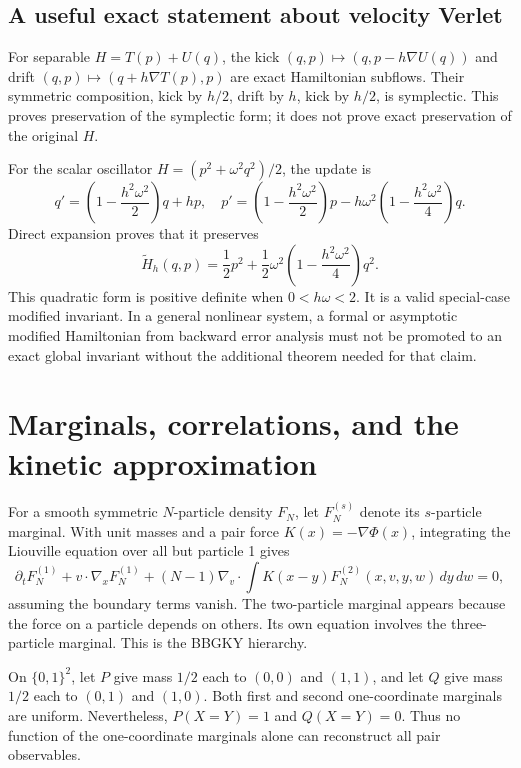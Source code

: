 \subsection{A useful exact statement about velocity Verlet}

For separable $H=T(p)+U(q)$, the kick
$(q,p)\mapsto(q,p-h\nabla U(q))$ and drift
$(q,p)\mapsto(q+h\nabla T(p),p)$ are exact Hamiltonian subflows.
Their symmetric composition, kick by $h/2$, drift by $h$, kick by
$h/2$, is symplectic.  This proves preservation of the symplectic form;
it does not prove exact preservation of the original $H$.

For the scalar oscillator $H=(p^2+\omega^2q^2)/2$, the update is
\[
 q'=\left(1-\frac{h^2\omega^2}{2}\right)q+hp,
 \quad
 p'=\left(1-\frac{h^2\omega^2}{2}\right)p
       -h\omega^2\left(1-\frac{h^2\omega^2}{4}\right)q.
\]
Direct expansion proves that it preserves
\begin{equation}
 \widetilde H_h(q,p)
 =\frac12p^2+\frac12\omega^2
       \left(1-\frac{h^2\omega^2}{4}\right)q^2.
 \label{eq:micro-verlet-invariant}
\end{equation}
This quadratic form is positive definite when $0<h\omega<2$.
It is a valid special-case modified invariant.  In a general nonlinear
system, a formal or asymptotic modified Hamiltonian from backward error
analysis must not be promoted to an exact global invariant without the
additional theorem needed for that claim.

\section{Marginals, correlations, and the kinetic approximation}

For a smooth symmetric $N$-particle density $F_N$, let $F_N^{(s)}$
denote its $s$-particle marginal.  With unit masses and a pair force
$K(x)=-\nabla\Phi(x)$, integrating the Liouville equation over all
but particle 1 gives
\begin{equation}
 \partial_tF_N^{(1)}+v\cdot\nabla_xF_N^{(1)}
 +(N-1)\nabla_v\cdot
   \int K(x-y)F_N^{(2)}(x,v,y,w)\,dy\,dw=0,
 \label{eq:micro-bbgky-first}
\end{equation}
assuming the boundary terms vanish.  The two-particle marginal appears
because the force on a particle depends on others.  Its own equation
involves the three-particle marginal.  This is the BBGKY hierarchy.

\begin{example}
\label{ex:micro-marginal}
On $\{0,1\}^2$, let $P$ give mass $1/2$ each to $(0,0)$ and
$(1,1)$, and let $Q$ give mass $1/2$ each to $(0,1)$ and $(1,0)$.
Both first and second one-coordinate marginals are uniform.  Nevertheless,
$P(X=Y)=1$ and $Q(X=Y)=0$.  Thus no function of the one-coordinate
marginals alone can reconstruct all pair observables.
\end{example}

